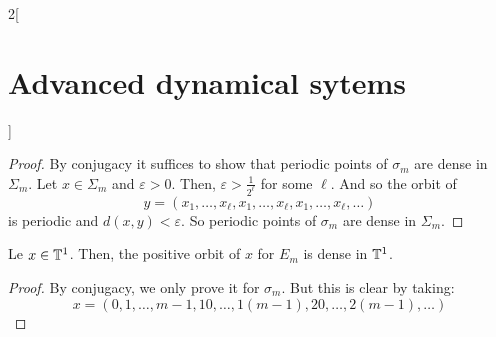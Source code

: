 \documentclass[../../../main_math.tex]{subfiles}
\begin{document}
\begin{multicols}{2}[\section{Advanced dynamical sytems}]
  \begin{proof}
    By conjugacy it suffices to show that periodic points of $\sigma_m$ are dense in $\Sigma_m$. Let $x\in \Sigma_m$ and $\varepsilon>0$. Then, $\varepsilon>\frac{1}{2^\ell}$ for some $\ell$. And so the orbit of
    $$
      y=(x_1,\ldots,x_\ell,x_1,\ldots,x_\ell,x_1,\ldots,x_\ell,\ldots)
    $$
    is periodic and $d(x,y)<\varepsilon$. So periodic points of $\sigma_m$ are dense in $\Sigma_m$.
  \end{proof}
  \begin{proposition}
    Le $x\in \mathbb{T}^1$. Then, the positive orbit of $x$ for $E_m$ is dense in $\mathbb{T}^1$.
  \end{proposition}
  \begin{proof}
    By conjugacy, we only prove it for $\sigma_m$. But this is clear by taking:
    $$
      x=(0,1,\ldots,m-1,10,\ldots,1(m-1),20,\ldots,2(m-1),\ldots)
    $$
  \end{proof}

\end{multicols}
\end{document}
